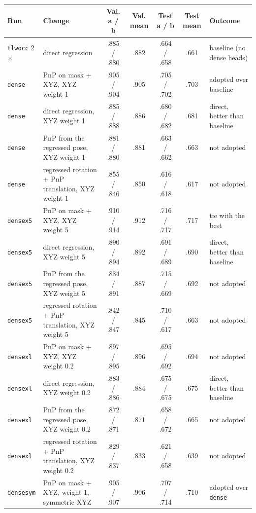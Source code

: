 \begin{table}[t]
  \centering
  \small
  \begin{tabular}{@{}llccccl@{}}
    \toprule
    Run & Change & Val. a / b & Val. mean & Test a / b & Test mean & Outcome \\
    \midrule
    \texttt{tlwocc} 2$\times$ & direct regression & .885 / .880 & .882 & .664 / .658 & .661 & baseline (no dense heads) \\
    \texttt{dense} & PnP on mask + XYZ, XYZ weight 1 & .905 / .904 & .905 & .705 / .702 & .703 & adopted over baseline \\
    \texttt{dense} & direct regression, XYZ weight 1 & .885 / .888 & .886 & .680 / .682 & .681 & direct, better than baseline \\
    \texttt{dense} & PnP from the regressed pose, XYZ weight 1 & .881 / .880 & .881 & .663 / .662 & .663 & not adopted \\
    \texttt{dense} & regressed rotation + PnP translation, XYZ weight 1 & .855 / .846 & .850 & .616 / .618 & .617 & not adopted \\
    \midrule
    \texttt{densex5} & PnP on mask + XYZ, XYZ weight 5 & .910 / .914 & .912 & .716 / .717 & .717 & tie with the best \\
    \texttt{densex5} & direct regression, XYZ weight 5 & .890 / .894 & .892 & .691 / .689 & .690 & direct, better than baseline \\
    \texttt{densex5} & PnP from the regressed pose, XYZ weight 5 & .884 / .891 & .887 & .715 / .669 & .692 & not adopted \\
    \texttt{densex5} & regressed rotation + PnP translation, XYZ weight 5 & .842 / .847 & .845 & .710 / .617 & .663 & not adopted \\
    \midrule
    \texttt{densexl} & PnP on mask + XYZ, XYZ weight 0.2 & .897 / .895 & .896 & .695 / .692 & .694 & not adopted \\
    \texttt{densexl} & direct regression, XYZ weight 0.2 & .883 / .886 & .884 & .675 / .675 & .675 & direct, better than baseline \\
    \texttt{densexl} & PnP from the regressed pose, XYZ weight 0.2 & .872 / .871 & .871 & .658 / .672 & .665 & not adopted \\
    \texttt{densexl} & regressed rotation + PnP translation, XYZ weight 0.2 & .829 / .837 & .833 & .621 / .658 & .639 & not adopted \\
    \midrule
    \texttt{densesym} & PnP on mask + XYZ, weight 1, symmetric XYZ & .905 / .907 & .906 & .707 / .714 & .710 & adopted over \texttt{dense} \\

\end{tabular}
\end{table}
